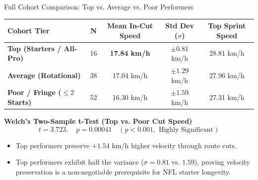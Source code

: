 \documentclass[aspectratio=169, 10pt]{beamer}
\begin{document}
\begin{frame}{Full Cohort Comparison: Top vs. Average vs. Poor Performers}
  \begin{table}[h]
    \centering
    \small
    \begin{tabular}{lcccc}
      \toprule
      \textbf{Cohort Tier} & \textbf{N} & \textbf{Mean In-Cut Speed} & \textbf{Std Dev ($\sigma$)} & \textbf{Top Sprint Speed} \\
      \midrule
      \textbf{Top (Starters / All-Pro)} & 16 & \textbf{17.84 km/h} & $\pm 0.81$ km/h & 28.81 km/h \\
      \textbf{Average (Rotational)} & 38 & 17.04 km/h & $\pm 1.29$ km/h & 27.96 km/h \\
      \textbf{Poor / Fringe ($\le 2$ Starts)} & 52 & 16.30 km/h & $\pm 1.59$ km/h & 27.31 km/h \\
      \bottomrule
    \end{tabular}
  \end{table}

  \begin{block}{\textbf{Welch's Two-Sample t-Test (Top vs. Poor Cut Speed)}}
    $$t = 3.723, \quad p = 0.00041 \quad (p < 0.001, \text{ Highly Significant})$$
    \vspace{-0.4cm}
    \begin{itemize}
      \item Top performers preserve $+1.54\text{ km/h}$ higher velocity through route cuts.
      \item Top performers exhibit half the variance ($\sigma = 0.81$ vs. $1.59$), proving velocity preservation is a non-negotiable prerequisite for NFL starter longevity.
    \end{itemize}
  \end{block}
\end{frame}
\end{document}
